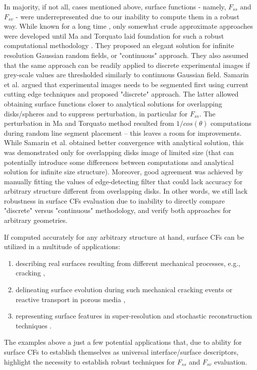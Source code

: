 \documentclass[1p]{elsarticle}
\begin{document}
In majority, if not all, cases mentioned above, surface functions - namely,
$F_{ss}$ and $F_{sv}$ - were underrepresented due to our inability to compute
them in a robust way. While known for a long time \cite{dietrich1995scattering}, only
somewhat crude approximate approaches \cite{seaton1986spatial} were developed
until Ma and Torquato laid foundation for such a robust computational
methodology \cite{ma2018SS}. They proposed an elegant solution for infinite
resolution Gaussian random fields, or "continuous" approach. They also assumed
that the same approach can be readily applied to discrete experimental images if
grey-scale values are thresholded similarly to continuous Gaussian
field. Samarin et al. \cite{Samarin} argued that experimental images needs
to be segmented first using current cutting edge techniques \cite{NNseg} and
proposed "discrete" approach. The latter allowed obtaining surface functions
closer to analytical solutions for overlapping disks/spheres and to suppress
perturbation, in particular for $F_{ss}$. The perturbation in Ma and Torquato
method resulted from $1/cos(\theta)$ computations during random line segment
placement -- this leaves a room for improvements. While Samarin et al. obtained
better convergence with analytical solution, this was demonstrated only for
overlapping disks image of limited size (that can potentially introduce some
differences between computations and analytical solution for infinite size
structure). Moreover, good agreement was achieved by manually fitting the values
of edge-detecting filter that could lack accuracy for arbitrary structure
different from overlapping disks. In other words, we still lack robustness in
surface CFs evaluation due to inability to directly compare "discrete" versus
"continuous" methodology, and verify both approaches for arbitrary geometries.

If computed accurately for any arbitrary structure at hand, surface CFs can be
utilized in a multitude of applications:
\begin{enumerate}
  \item describing real surfaces resulting from different mechanical processes,
    e.g., cracking \cite{hansen1991roughness,akhavan2012quantifying},
  \item delineating surface evolution \cite{chen2022} during such mechanical
    cracking events or reactive transport in porous media
    \cite{godinho2016,noiriel2021,prokhorov2022},
  \item representing surface features in super-resolution and stochastic
    reconstruction techniques \cite{chen2020super,janssens2020,karimpouli2022}.
\end{enumerate}
The examples above a just a few potential applications that, due to ability for
surface CFs to establish themselves as universal interface/surface descriptors,
highlight the necessity to establish robust techniques for $F_{ss}$ and $F_{sv}$
evaluation.
\end{document}
